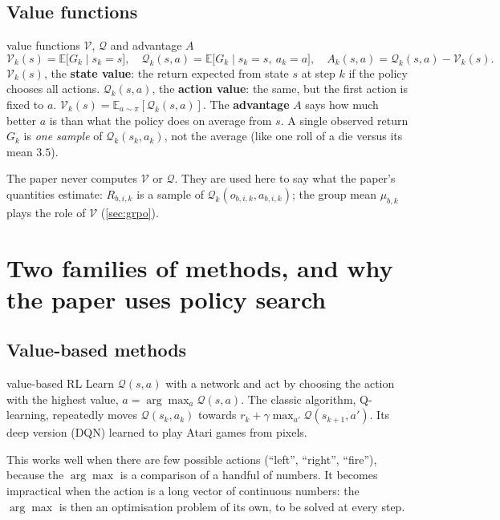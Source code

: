 \documentclass[11pt,a4paper]{article}
\newcommand{\E}{\mathbb{E}}
\newcommand{\Vf}{\mathcal{V}}
\newcommand{\Qf}{\mathcal{Q}}
\begin{document}
\subsection{Value functions}
\begin{newc}{value functions $\Vf$, $\Qf$ and advantage $A$}
\[
\Vf_k(s)=\E\big[G_k\mid s_k=s\big],\quad
\Qf_k(s,a)=\E\big[G_k\mid s_k=s,\ a_k=a\big],\quad
A_k(s,a)=\Qf_k(s,a)-\Vf_k(s).
\]
$\Vf_k(s)$, the \textbf{state value}: the return expected from state $s$ at step $k$ if the policy chooses all actions. $\Qf_k(s,a)$, the \textbf{action value}: the same, but the first action is fixed to $a$. $\Vf_k(s)=\E_{a\sim\pi}[\Qf_k(s,a)]$. The \textbf{advantage} $A$ says how much better $a$ is than what the policy does on average from $s$. A single observed return $G_k$ is \emph{one sample} of $\Qf_k(s_k,a_k)$, not the average (like one roll of a die versus its mean $3.5$).
\end{newc}
\begin{paperlink}
The paper never computes $\Vf$ or $\Qf$. They are used here to say what the paper's quantities estimate: $R_{b,i,k}$ is a sample of $\Qf_k(o_{b,i,k},a_{b,i,k})$; the group mean $\mu_{b,k}$ plays the role of $\Vf$ (\cref{sec:grpo}).
\end{paperlink}

\section{Two families of methods, and why the paper uses policy search}\label{sec:families}

\subsection{Value-based methods}
\begin{newc}{value-based RL}
Learn $\Qf(s,a)$ with a network and act by choosing the action with the highest value, $a=\arg\max_a\Qf(s,a)$. The classic algorithm, Q-learning, repeatedly moves $\Qf(s_k,a_k)$ towards $r_k+\gamma\max_{a'}\Qf(s_{k+1},a')$. Its deep version (DQN) learned to play Atari games from pixels.
\end{newc}
This works well when there are few possible actions (``left'', ``right'', ``fire''), because the $\arg\max$ is a comparison of a handful of numbers. It becomes impractical when the action is a long vector of continuous numbers: the $\arg\max$ is then an optimisation problem of its own, to be solved at every step.
\end{document}
